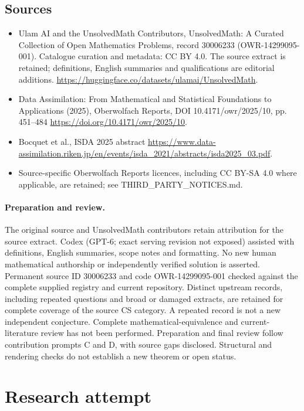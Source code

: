 \documentclass[11pt]{article}
\begin{document}
\subsection{Sources}
\begin{itemize}
\item[S1] Ulam AI and the UnsolvedMath Contributors, UnsolvedMath: A Curated Collection of Open Mathematics Problems, record 30006233 (OWR-14299095-001). Catalogue curation and metadata: CC BY 4.0. The source extract is retained; definitions, English summaries and qualifications are editorial additions.
\url{https://huggingface.co/datasets/ulamai/UnsolvedMath}.
\item[S2] Data Assimilation: From Mathematical and Statistical Foundations to Applications (2025), Oberwolfach Reports, DOI 10.4171/owr/2025/10, pp. 451--484
\url{https://doi.org/10.4171/owr/2025/10}.
\item[S3] Bocquet et al., ISDA 2025 abstract
\url{https://www.data-assimilation.riken.jp/en/events/isda_2021/abstracts/isda2025_03.pdf}.
\item Source-specific Oberwolfach Reports licences, including CC BY-SA 4.0 where applicable, are retained; see THIRD\_PARTY\_NOTICES.md.
\end{itemize}
\paragraph{Preparation and review.}
The original source and UnsolvedMath contributors retain attribution for the source extract. Codex (GPT-6; exact serving revision not exposed) assisted with definitions, English summaries, scope notes and formatting. No new human mathematical authorship or independently verified solution is asserted. Permanent source ID 30006233 and code OWR-14299095-001 checked against the complete supplied registry and current repository. Distinct upstream records, including repeated questions and broad or damaged extracts, are retained for complete coverage of the source CS category. A repeated record is not a new independent conjecture. Complete mathematical-equivalence and current-literature review has not been performed. Preparation and final review follow contribution prompts C and D, with source gaps disclosed. Structural and rendering checks do not establish a new theorem or open status.
\label{end:30006233}

\section{Research attempt}
\end{document}
